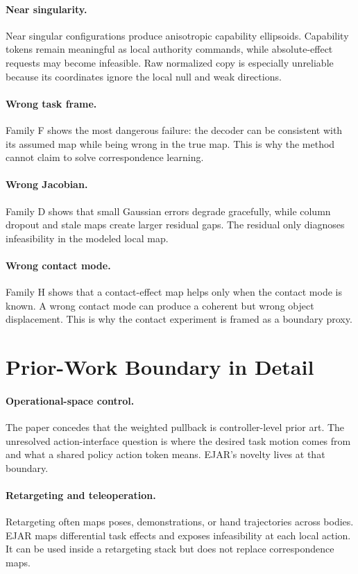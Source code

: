 \documentclass{article}
\begin{document}
\paragraph{Near singularity.}
Near singular configurations produce anisotropic capability ellipsoids. Capability tokens remain meaningful as local authority commands, while absolute-effect requests may become infeasible. Raw normalized copy is especially unreliable because its coordinates ignore the local null and weak directions.

\paragraph{Wrong task frame.}
Family F shows the most dangerous failure: the decoder can be consistent with its assumed map while being wrong in the true map. This is why the method cannot claim to solve correspondence learning.

\paragraph{Wrong Jacobian.}
Family D shows that small Gaussian errors degrade gracefully, while column dropout and stale maps create larger residual gaps. The residual only diagnoses infeasibility in the modeled local map.

\paragraph{Wrong contact mode.}
Family H shows that a contact-effect map helps only when the contact mode is known. A wrong contact mode can produce a coherent but wrong object displacement. This is why the contact experiment is framed as a boundary proxy.

\section{Prior-Work Boundary in Detail}

\paragraph{Operational-space control.}
The paper concedes that the weighted pullback is controller-level prior art. The unresolved action-interface question is where the desired task motion comes from and what a shared policy action token means. EJAR's novelty lives at that boundary.

\paragraph{Retargeting and teleoperation.}
Retargeting often maps poses, demonstrations, or hand trajectories across bodies. EJAR maps differential task effects and exposes infeasibility at each local action. It can be used inside a retargeting stack but does not replace correspondence maps.
\end{document}
